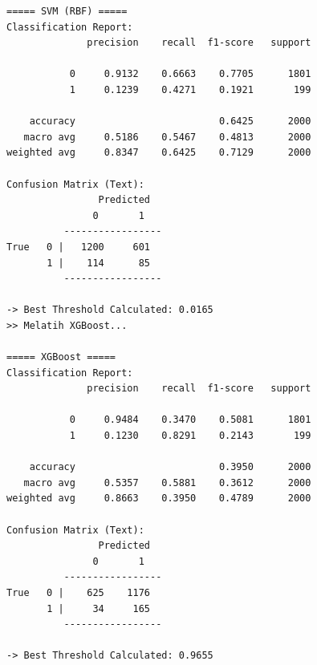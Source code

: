 \begin{lstlisting}[caption={Output 5}]
===== SVM (RBF) =====
Classification Report:
              precision    recall  f1-score   support

           0     0.9132    0.6663    0.7705      1801
           1     0.1239    0.4271    0.1921       199

    accuracy                         0.6425      2000
   macro avg     0.5186    0.5467    0.4813      2000
weighted avg     0.8347    0.6425    0.7129      2000

Confusion Matrix (Text):
                Predicted
               0       1
          -----------------
True   0 |   1200     601
       1 |    114      85
          -----------------

-> Best Threshold Calculated: 0.0165
>> Melatih XGBoost...

===== XGBoost =====
Classification Report:
              precision    recall  f1-score   support

           0     0.9484    0.3470    0.5081      1801
           1     0.1230    0.8291    0.2143       199

    accuracy                         0.3950      2000
   macro avg     0.5357    0.5881    0.3612      2000
weighted avg     0.8663    0.3950    0.4789      2000

Confusion Matrix (Text):
                Predicted
               0       1
          -----------------
True   0 |    625    1176
       1 |     34     165
          -----------------

-> Best Threshold Calculated: 0.9655
\end{lstlisting}

